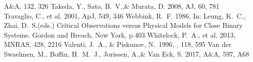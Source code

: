 \documentclass[a4paper,fleqn,usenatbib]{mnras}
\begin{document}
\begin{thebibliography}{99}
A$\&$A, 132, 326
Takeda, Y., Sato, B.~V.,\& Murata, D. 2008, 
AJ, 60, 781
Travaglio, C., et al. 2001, 
ApJ, 549, 346
Webbink, R.~F. 1986, 
In: Leung, K.~C., Zhai, D.~S.(eds.) Critical Observations versus Physical Models for Close Binary Systems. Gordon and Breach, New York, p.403
Whitelock, P.~A., et al. 2013, 
MNRAS, 428, 2216
 Valenti, J.~A., \& Piskunov, N.\ 1996, \aaps, 118, 595 
Van der Swaelmen, M., Boffin, H.~M.~J., Jorissen, A.,\& Van Eck, S. 2017, 
A$\&$A, 597, A68






\end{thebibliography}


\bsp	%
\label{lastpage}
\end{document}

